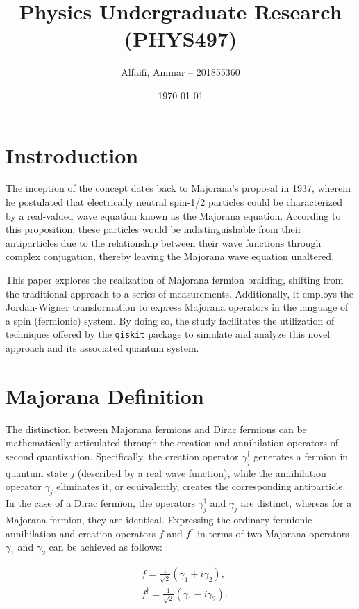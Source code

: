 \documentclass{article}
\title{Physics Undergraduate Research (PHYS497)}
\author{Alfaifi, Ammar -- 201855360}
\date{\today}
\def\c#1{\texttt{#1}}
\begin{document}
\maketitle

\section{Instroduction} %
\label{sec:Instroduction}
The inception of the concept dates back to Majorana's proposal in 1937, wherein he postulated that electrically neutral spin-1/2 particles could be characterized by a real-valued wave equation known as the Majorana equation. According to this proposition, these particles would be indistinguishable from their antiparticles due to the relationship between their wave functions through complex conjugation, thereby leaving the Majorana wave equation unaltered.

This paper explores the realization of Majorana fermion braiding, shifting from the traditional approach to a series of measurements. Additionally, it employs the Jordan-Wigner transformation to express Majorana operators in the language of a spin (fermionic) system. By doing so, the study facilitates the utilization of techniques offered by the \c{qiskit} package to simulate and analyze this novel approach and its associated quantum system.

\section{Majorana Definition} %
\label{sec:Majorana Definition}
The distinction between Majorana fermions and Dirac fermions can be mathematically articulated through the creation and annihilation operators of second quantization. Specifically, the creation operator $\gamma_j^{\dagger}$ generates a fermion in quantum state $j$ (described by a real wave function), while the annihilation operator $\gamma_j$ eliminates it, or equivalently, creates the corresponding antiparticle. In the case of a Dirac fermion, the operators $\gamma_j^{\dagger}$ and $\gamma_j$ are distinct, whereas for a Majorana fermion, they are identical. Expressing the ordinary fermionic annihilation and creation operators $f$ and $f^{\dagger}$ in terms of two Majorana operators $\gamma_1$ and $\gamma_2$ can be achieved as follows:

$$
	\begin{aligned}
		 & f=\frac{1}{\sqrt{2}}\left(\gamma_1+i \gamma_2\right),            \\
		 & f^{\dagger}=\frac{1}{\sqrt{2}}\left(\gamma_1-i \gamma_2\right) .
	\end{aligned}
$$
\end{document}
